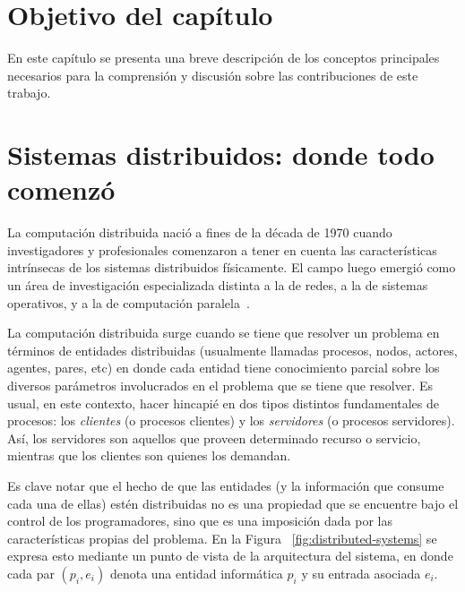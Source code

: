 \section{Objetivo del capítulo}\label{sec:prelim}


En este capítulo se presenta una breve descripción de los conceptos principales
necesarios para la comprensión y discusión sobre las
contribuciones de este trabajo.

\section{Sistemas distribuidos: donde todo comenzó}

La computación distribuida nació a fines de la década de 1970 cuando investigadores y profesionales
comenzaron a tener en cuenta las características intrínsecas de los sistemas distribuidos físicamente.
El campo luego emergió como un área de investigación especializada distinta a la de redes, a la de sistemas
operativos, y a la de computación paralela~\cite{raynal.dist.systems}.

La computación distribuida surge cuando se tiene que resolver un problema en términos de entidades
distribuidas (usualmente llamadas procesos, nodos, actores, agentes, pares, etc) en donde cada
entidad tiene conocimiento parcial sobre los diversos parámetros involucrados en el problema que
se tiene que resolver.
Es usual, en este contexto, hacer hincapié en dos tipos distintos fundamentales de procesos:
los \textit{clientes} (o procesos clientes) y los \textit{servidores} (o procesos servidores).
Así, los servidores son aquellos que proveen determinado recurso o servicio, mientras que los
clientes son quienes los demandan.

Es clave notar que el hecho de que las entidades (y la información que consume cada una de ellas)
estén distribuidas no es una propiedad que se encuentre bajo el control de los programadores, sino 
que es una imposición dada por las características propias del problema. En la 
Figura ~\ref{fig:distributed-systems} se expresa esto mediante un punto de vista
de la arquitectura del sistema, en donde cada par $(p_i, e_i)$ denota una entidad informática $p_i$ y su
entrada asociada $e_i$.

